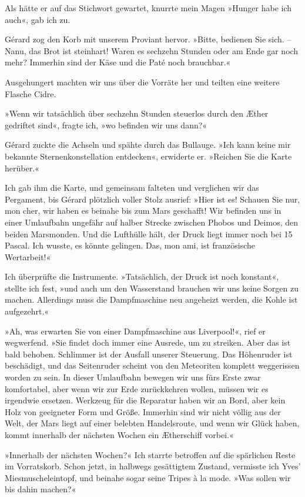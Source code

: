 Als hätte er auf das Stichwort gewartet, knurrte mein Magen »Hunger
habe ich auch«, gab ich zu.

Gérard zog den Korb mit unserem Proviant hervor. »Bitte, bedienen
Sie sich. – Nanu, das Brot ist steinhart! Waren es sechzehn Stunden
oder am Ende gar noch mehr? Immerhin sind der Käse und die Paté
noch brauchbar.«

Ausgehungert machten wir uns über die Vorräte her und teilten eine
weitere Flasche Cidre.

»Wenn wir tatsächlich über sechzehn Stunden steuerlos durch den
Æther gedriftet sind«, fragte ich, »wo befinden wir uns dann?«

Gérard zuckte die Achseln und spähte durch das Bullauge. »Ich kann
keine mir bekannte Sternenkonstellation entdecken«, erwiderte er.
»Reichen Sie die Karte herüber.«

Ich gab ihm die Karte, und gemeinsam falteten und verglichen wir
das Pergament, bis Gérard plötzlich voller Stolz ausrief: »Hier ist
es! Schauen Sie nur, mon cher, wir haben es beinahe bis zum Mars
geschafft! Wir befinden uns in einer Umlaufbahn ungefähr auf halber
Strecke zwischen Phobos und Deimos, den beiden Marsmonden. Und die
Lufthülle hält, der Druck liegt immer noch bei 15 Pascal. Ich
wusste, es könnte gelingen. Das, mon ami, ist französische
Wertarbeit!«

Ich überprüfte die Instrumente. »Tatsächlich, der Druck ist noch
konstant«, stellte ich fest, »und auch um den Wasserstand brauchen
wir uns keine Sorgen zu machen. Allerdings muss die Dampfmaschine
neu angeheizt werden, die Kohle ist aufgezehrt.«

»Ah, was erwarten Sie von einer Dampfmaschine aus Liverpool!«, rief
er wegwerfend. »Sie findet doch immer eine Ausrede, um zu streiken.
Aber das ist bald behoben. Schlimmer ist der Ausfall unserer
Steuerung. Das Höhenruder ist beschädigt, und das Seitenruder
scheint von den Meteoriten komplett weggerissen worden zu sein. In
dieser Umlaufbahn bewegen wir uns fürs Erste zwar komfortabel, aber
wenn wir zur Erde zurückkehren wollen, müssen wir es irgendwie
ersetzen. Werkzeug für die Reparatur haben wir an Bord, aber kein
Holz von geeigneter Form und Größe. Immerhin sind wir nicht völlig
aus der Welt, der Mars liegt auf einer belebten Handelsroute, und
wenn wir Glück haben, kommt innerhalb der nächsten Wochen ein
Ætherschiff vorbei.«

»Innerhalb der nächsten Wochen?« Ich starrte betroffen auf die
spärlichen Reste im Vorratskorb. Schon jetzt, in halbwegs
gesättigtem Zustand, vermisste ich Yves’ Miesmuscheleintopf, und
beinahe sogar seine Tripes à la mode. »Was sollen wir bis dahin
machen?«

